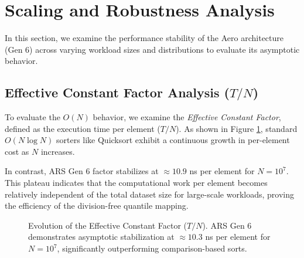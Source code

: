 \section{Scaling and Robustness Analysis}
In this section, we examine the performance stability of the Aero architecture (Gen 6) across varying workload sizes and distributions to evaluate its asymptotic behavior.

\subsection{Effective Constant Factor Analysis (\texorpdfstring{$T/N$}{T/N})}
To evaluate the $O(N)$ behavior, we examine the \textit{Effective Constant Factor}, defined as the execution time per element ($T/N$). As shown in Figure \ref{fig:constant_factor}, standard $O(N \log N)$ sorters like Quicksort exhibit a continuous growth in per-element cost as $N$ increases. 

In contrast, ARS Gen 6 factor stabilizes at $\approx 10.9$ ns per element for $N = 10^7$. This plateau indicates that the computational work per element becomes relatively independent of the total dataset size for large-scale workloads, proving the efficiency of the division-free quantile mapping.

\begin{figure}[htbp]
\centering
{}
\caption{Evolution of the Effective Constant Factor ($T/N$). ARS Gen 6 demonstrates asymptotic stabilization at $\approx 10.3$ ns per element for $N=10^7$, significantly outperforming comparison-based sorts.}
\label{fig:constant_factor}
\end{figure}

